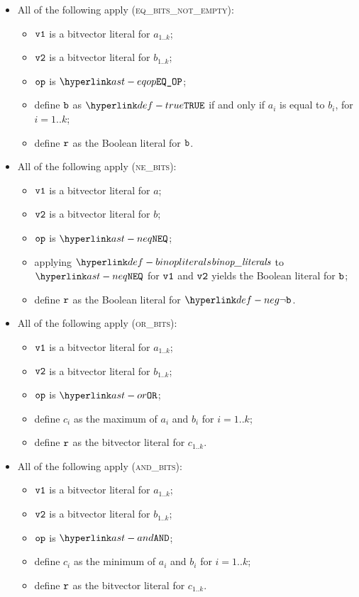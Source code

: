 \begin{itemize}
  \item All of the following apply (\textsc{eq\_bits\_not\_empty}):
  \begin{itemize}
    \item $\texttt{v1}$ is a bitvector literal for $a_{1..k}$;
    \item $\texttt{v2}$ is a bitvector literal for $b_{1..k}$;
    \item $\texttt{op}$ is $\EQOP$;
    \item define $\texttt{b}$ as $\True$ if and only if $a_i$ is equal to $b_i$, for $i=1..k$;
    \item define $\texttt{r}$ as the Boolean literal for $\texttt{b}$.
  \end{itemize}

  \item All of the following apply (\textsc{ne\_bits}):
  \begin{itemize}
    \item $\texttt{v1}$ is a bitvector literal for $a$;
    \item $\texttt{v2}$ is a bitvector literal for $b$;
    \item $\texttt{op}$ is $\NEQ$;
    \item applying $\binopliterals$ to $\NEQ$ for $\texttt{v1}$ and $\texttt{v2}$ yields the Boolean literal for $\texttt{b}$\ProseOrTypeError;
    \item define $\texttt{r}$ as the Boolean literal for $\neg\vb$.
  \end{itemize}

  \item All of the following apply (\textsc{or\_bits}):
  \begin{itemize}
    \item $\texttt{v1}$ is a bitvector literal for $a_{1..k}$;
    \item $\texttt{v2}$ is a bitvector literal for $b_{1..k}$;
    \item $\texttt{op}$ is $\OR$;
    \item define $c_i$ as the maximum of $a_i$ and $b_i$ for $i=1..k$;
    \item define $\texttt{r}$ as the bitvector literal for $c_{1..k}$.
  \end{itemize}

  \item All of the following apply (\textsc{and\_bits}):
  \begin{itemize}
    \item $\texttt{v1}$ is a bitvector literal for $a_{1..k}$;
    \item $\texttt{v2}$ is a bitvector literal for $b_{1..k}$;
    \item $\texttt{op}$ is $\AND$;
    \item define $c_i$ as the minimum of $a_i$ and $b_i$ for $i=1..k$;
    \item define $\texttt{r}$ as the bitvector literal for $c_{1..k}$.
  \end{itemize}


\end{itemize}
